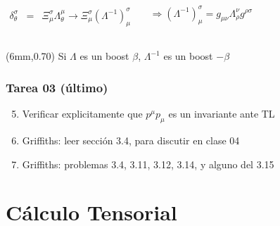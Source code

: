 \documentclass[xetex,mathserif,serif,10pt]{beamer}
\begin{document}
\begin{frame}
\begin{itemize}
\begin{columns}
\begin{eqnarray}
          \delta^{\sigma}_{\theta}  &=& \Xi_\mu^\sigma \Lambda^{\mu}_{\theta} \to \Xi_\mu^\sigma \left (\Lambda^{-1} \right )^\sigma_\mu \nonumber
        \end{eqnarray}
        \vspace{-2.0em}
        \begin{exampleblock}{}
          \begin{equation}
            \Rightarrow \left (\Lambda^{-1} \right )^\sigma_\mu = g_{\mu\nu} \Lambda^{\nu}_{\rho} g^{\rho\sigma}
          \end{equation}
        \end{exampleblock}
      \end{columns}
  \end{itemize}
  \begin{textblock*}{30mm}(6mm,0.70\textheight)
    \small{\alert{Si $\Lambda$ es un boost $\beta$, $\Lambda^{-1}$ es un boost $-\beta$}}
  \end{textblock*}
\end{frame}

\begin{frame}
  \frametitle{\alert{Tarea 03 (último)}}
  \begin{enumerate}\setcounter{enumi}{04}
    \item Verificar explicitamente que $p^\mu p_\mu$ es un invariante ante TL
    \item Griffiths: leer sección 3.4, para discutir en clase 04
    \item Griffiths: problemas 3.4, 3.11, 3.12, 3.14, y alguno del 3.15
  \end{enumerate}
\end{frame}

\section{Cálculo Tensorial}
\end{document}
